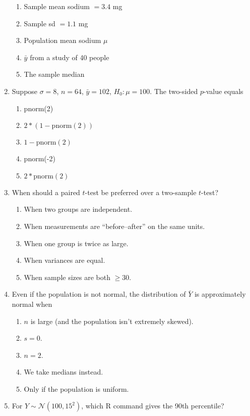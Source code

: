 \documentclass{article}
\begin{document}
\begin{enumerate}
    \begin{enumerate}[label=\Alph*.]
        \item Sample mean sodium $=3.4$ mg
        \item Sample sd $=1.1$ mg
        \item Population mean sodium $\mu$
        \item $\bar y$ from a study of 40 people
        \item The sample median
    \end{enumerate}
\item Suppose $\sigma=8$, $n=64$, $\bar y=102$, $H_0:\mu=100$. The two-sided $p$-value equals
    \begin{enumerate}[label=\Alph*.]
        \item pnorm(2)
        \item $2 * (1 - \text{pnorm}(2))$
        \item $1 - \text{pnorm}(2)$
        \item pnorm(-2)
        \item $2 * \text{pnorm}(2)$
    \end{enumerate}
\item When should a paired $t$-test be preferred over a two-sample $t$-test?
    \begin{enumerate}[label=\Alph*.]
        \item When two groups are independent.
        \item When measurements are ``before–after'' on the same units.
        \item When one group is twice as large.
        \item When variances are equal.
        \item When sample sizes are both $\ge 30$.
    \end{enumerate}
\item Even if the population is not normal, the distribution of $\bar Y$ is approximately normal when
    \begin{enumerate}[label=\Alph*.]
        \item $n$ is large (and the population isn’t extremely skewed).
        \item $s=0$.
        \item $n=2$.
        \item We take medians instead.
        \item Only if the population is uniform.
    \end{enumerate}
\item For $Y\sim\mathcal N(100,15^2)$, which R command gives the 90th percentile?

\end{enumerate}
\end{document}
